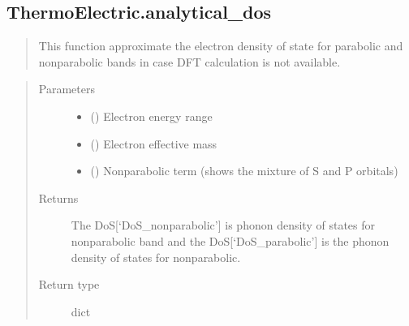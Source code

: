 \documentclass[letterpaper,10pt,english]{sphinxmanual}
\begin{document}
\subsection{ThermoElectric.analytical\_dos}
\label{\detokenize{autosummary/ThermoElectric.analytical_dos:thermoelectric-analytical-dos}}\label{\detokenize{autosummary/ThermoElectric.analytical_dos::doc}}

\begin{fulllineitems}
\label{\detokenize{autosummary/ThermoElectric.analytical_dos:ThermoElectric.analytical_dos}}\begin{quote}

\sphinxAtStartPar
This function approximate the electron density of state for parabolic and non\sphinxhyphen{}parabolic bands
in case DFT calculation is not available.
\end{quote}
\begin{quote}\begin{description}
\item[{Parameters}] \leavevmode\begin{itemize}
\item {} 
\sphinxAtStartPar
{} () \textendash{} Electron energy range

\item {} 
\sphinxAtStartPar
{} () \textendash{} Electron effective mass

\item {} 
\sphinxAtStartPar
{} () \textendash{} Non\sphinxhyphen{}parabolic term (shows the mixture of S and P orbitals)

\end{itemize}

\item[{Returns}] \leavevmode
\sphinxAtStartPar
{} \textendash{} The DoS{[}‘DoS\_nonparabolic’{]} is phonon density of states for non\sphinxhyphen{}parabolic band and
the DoS{[}‘DoS\_parabolic’{]} is the phonon density of states for non\sphinxhyphen{}parabolic.

\item[{Return type}] \leavevmode
\sphinxAtStartPar
dict

\end{description}\end{quote}

\end{fulllineitems}
\end{document}
